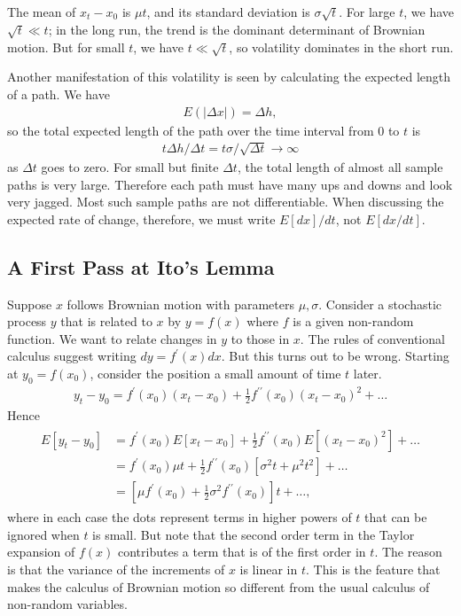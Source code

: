 \documentclass[\topdir/lecture\_notes.tex]{subfiles}
\begin{document}
The mean of \(x_{t}-x_{0}\) is \(\mu t\), and its standard deviation is \(\sigma \sqrt{t}\). For large \(t\), we have \(\sqrt{t} \ll t\); in the long run, the trend is the dominant determinant of Brownian motion. But for small \(t\), we have \(t \ll \sqrt{t}\), so volatility dominates in the short run.

Another manifestation of this volatility is seen by calculating the expected length of a path. We have
\begin{align*}
E(|\Delta x|)=\Delta h,
\end{align*}
so the total expected length of the path over the time interval from 0 to \(t\) is
\begin{align*}
t \Delta h / \Delta t=t \sigma / \sqrt{\Delta t} \rightarrow \infty
\end{align*}
as \(\Delta t\) goes to zero. For small but finite \(\Delta t\), the total length of almost all sample paths is very large. Therefore each path must have many ups and downs and look very jagged. Most such sample paths are not differentiable. When discussing the expected rate of change, therefore, we must write \(E[dx] / dt\), not \(E[dx / dt]\).

\subsection{A First Pass at Ito's Lemma}
Suppose \(x\) follows Brownian motion with parameters \(\mu, \sigma\). Consider a stochastic process \(y\) that is related to \(x\) by \(y=f(x)\) where \(f\) is a given non-random function. We want to relate changes in \(y\) to those in \(x\). The rules of conventional calculus suggest writing \(d y=f^{\prime}(x) dx\). But this turns out to be wrong. Starting at \(y_{0}=f\left(x_{0}\right)\), consider the position a small amount of time \(t\) later.
\begin{align*}
y_{t}-y_{0}=f^{\prime}\left(x_{0}\right)\left(x_{t}-x_{0}\right)+\frac{1}{2} f^{\prime \prime}\left(x_{0}\right)\left(x_{t}-x_{0}\right)^{2}+\ldots
\end{align*}
Hence
\begin{align*}
\begin{aligned}
E\left[y_{t}-y_{0}\right] & =f^{\prime}\left(x_{0}\right) E\left[x_{t}-x_{0}\right]+\frac{1}{2} f^{\prime \prime}\left(x_{0}\right) E\left[\left(x_{t}-x_{0}\right)^{2}\right]+\ldots \\
& =f^{\prime}\left(x_{0}\right) \mu t+\frac{1}{2} f^{\prime \prime}\left(x_{0}\right)\left[\sigma^{2} t+\mu^{2} t^{2}\right]+\ldots \\
& =\left[\mu f^{\prime}\left(x_{0}\right)+\frac{1}{2} \sigma^{2} f^{\prime \prime}\left(x_{0}\right)\right] t+\ldots,
\end{aligned}
\end{align*}
where in each case the dots represent terms in higher powers of \(t\) that can be ignored when \(t\) is small. But note that the second order term in the Taylor expansion of \(f(x)\) contributes a term that is of the first order in \(t\). The reason is that the variance of the increments of \(x\) is linear in \(t\). This is the feature that makes the calculus of Brownian motion so different from the usual calculus of non-random variables.
\end{document}
